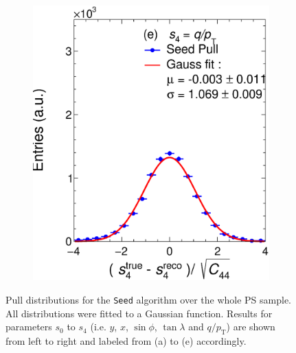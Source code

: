 \begin{figure}[!ht]
\begin{subfigure}{0.32\textwidth}
         \includegraphics[width=\textwidth]{figures/ch4-KF_NDGArLite/MC/ALICE+KF/UnitSeed_p4.eps}
         \caption{}
         \label{fig:resp4SeedGAr}
     \end{subfigure}
        \caption[Pull distributions for the \texttt{Seed} algorithm over the whole PS sample.]{Pull distributions for the \texttt{Seed} algorithm over the whole PS sample. All distributions were fitted to a Gaussian function. Results for parameters $s_0$ to $s_4$ (i.e. $y$, $x$, $\sin\phi$, $\tan\lambda$ and $q/p_{\text{T}}$) are shown from left to right and labeled from (a) to (e) accordingly. }
        \label{fig:UnitGAr}
\end{figure}

